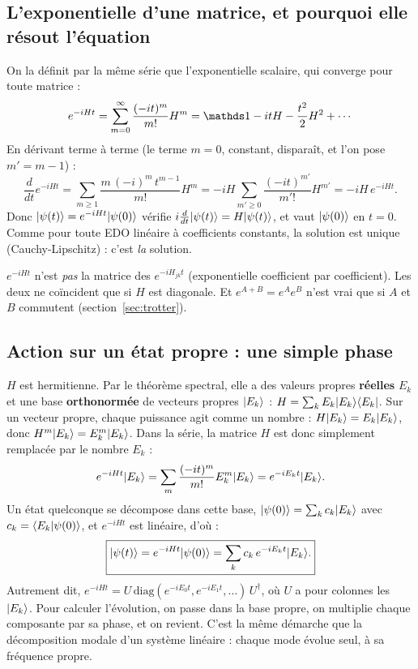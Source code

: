 \subsection{L'exponentielle d'une matrice, et pourquoi elle résout l'équation}
On la définit par la même série que l'exponentielle scalaire, qui converge pour toute matrice :
\[ e^{-iHt}=\sum_{m=0}^{\infty}\frac{(-it)^m}{m!}H^m=\Id-itH-\frac{t^2}{2}H^2+\cdots \]
En dérivant terme à terme (le terme $m=0$, constant, disparaît, et l'on pose $m'=m-1$) :
\[ \frac{d}{dt}e^{-iHt}=\sum_{m\ge1}\frac{m\,(-i)^m\,t^{m-1}}{m!}H^m=-iH\sum_{m'\ge0}\frac{(-it)^{m'}}{m'!}H^{m'}=-iH\,e^{-iHt}. \]
Donc $\lvert \psi(t)\rangle=e^{-iHt}\lvert \psi(0)\rangle$ vérifie $i\frac{d}{dt}\lvert \psi(t)\rangle=H\lvert \psi(t)\rangle$, et vaut $\lvert \psi(0)\rangle$ en $t=0$. Comme pour toute EDO linéaire à coefficients constants, la solution est unique (Cauchy-Lipschitz) : c'est \emph{la} solution.

\begin{piege}
$e^{-iHt}$ n'est \emph{pas} la matrice des $e^{-iH_{jk}t}$ (exponentielle coefficient par coefficient). Les deux ne coïncident que si $H$ est diagonale. Et $e^{A+B}=e^Ae^B$ n'est vrai que si $A$ et $B$ commutent (section~\ref{sec:trotter}).
\end{piege}

\subsection{Action sur un état propre : une simple phase}
$H$ est hermitienne. Par le théorème spectral, elle a des valeurs propres \textbf{réelles} $E_k$ et une base \textbf{orthonormée} de vecteurs propres $\lvert E_k\rangle$ : $H=\sum_kE_k\lvert E_k\rangle\langle E_k\rvert$. Sur un vecteur propre, chaque puissance agit comme un nombre : $H\lvert E_k\rangle=E_k\lvert E_k\rangle$, donc $H^m\lvert E_k\rangle=E_k^m\lvert E_k\rangle$. Dans la série, la matrice $H$ est donc simplement remplacée par le nombre $E_k$ :
\[ e^{-iHt}\lvert E_k\rangle=\sum_m\frac{(-it)^m}{m!}E_k^m\lvert E_k\rangle=e^{-iE_kt}\lvert E_k\rangle. \]
Un état quelconque se décompose dans cette base, $\lvert \psi(0)\rangle=\sum_kc_k\lvert E_k\rangle$ avec $c_k=\langle E_k\vert \psi(0)\rangle$, et $e^{-iHt}$ est linéaire, d'où :
\[ \boxed{\lvert \psi(t)\rangle=e^{-iHt}\lvert \psi(0)\rangle=\sum_kc_k\,e^{-iE_kt}\lvert E_k\rangle.} \]
Autrement dit, $e^{-iHt}=U\,\mathrm{diag}(e^{-iE_0t},e^{-iE_1t},\dots)\,U^\dagger$, où $U$ a pour colonnes les $\lvert E_k\rangle$. Pour calculer l'évolution, on passe dans la base propre, on multiplie chaque composante par sa phase, et on revient. C'est la même démarche que la décomposition modale d'un système linéaire : chaque mode évolue seul, à sa fréquence propre.

